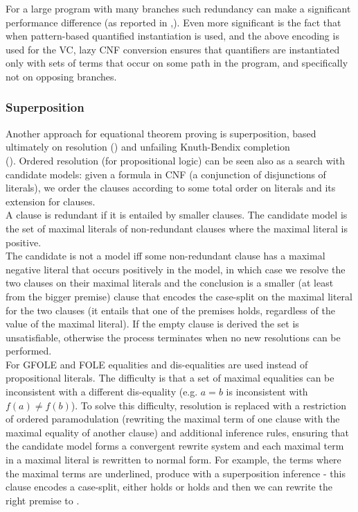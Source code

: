 For a large program with many branches such redundancy can make a significant performance difference (as reported in \cite{DBLP:conf/cav/BarrettDS02},\cite{DBLP:journals/jacm/DetlefsNS05}). Even more significant is the fact that when pattern-based quantified instantiation is used, 
and the above encoding is used for the VC, lazy CNF conversion ensures that quantifiers are instantiated only with sets of terms that occur on some path in the program, and specifically not on opposing branches.


\subsubsection*{Superposition}
Another approach for equational theorem proving is superposition, based ultimately on resolution (\cite{Robinson:1965:MLB:321250.321253}) and unfailing Knuth-Bendix completion\\
(\cite{DBLP:journals/logcom/BachmairG94}).
Ordered resolution (for propositional logic) can be seen also as a search with candidate models: given a formula in CNF (a conjunction of disjunctions of literals), we order the clauses according to some total order on literals and its extension for clauses.\\
A clause is redundant if it is entailed by smaller clauses. 
The candidate model is the set of maximal literals of non-redundant clauses where the maximal literal is positive.\\
The candidate is not a model iff some non-redundant clause has a maximal negative literal that occurs positively in the model, in which case we resolve the two clauses on their maximal literals and the conclusion is a smaller (at least from the bigger premise) clause that encodes the case-split on the maximal literal for the two clauses (it entails that one of the premises holds, regardless of the value of the maximal literal). If the empty clause is derived the set is unsatisfiable, otherwise the process terminates when no new resolutions can be performed.\\
For GFOLE and FOLE equalities and dis-equalities are used instead of propositional literals. The difficulty is that a set of maximal equalities can be inconsistent with a different dis-equality (e.g. $a=b$ is inconsistent with $f(a)\neq f(b)$). 
To solve this difficulty, resolution is replaced with a restriction of ordered paramodulation (rewriting the maximal term of one clause with the maximal equality of another clause) and additional inference rules, ensuring that the candidate model forms a convergent rewrite system and each maximal term in a maximal literal is rewritten to normal form. For example, the terms  where the maximal terms are underlined, produce  with a superposition inference - this clause encodes a case-split, either  holds or  holds and then we can rewrite the right premise to .
